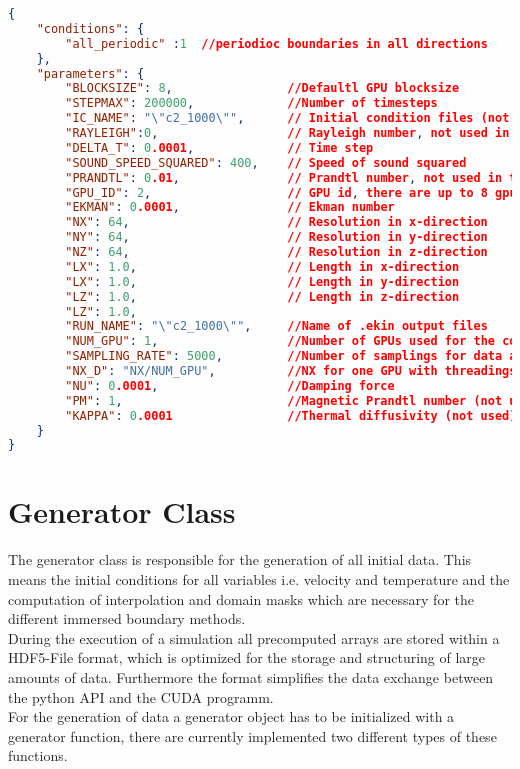 \begin{minipage}{\linewidth}
\begin{lstlisting}[language=json, caption={'Example of a "parameter.json" file.}, label={lst_json} ]
{
    "conditions": {
        "all_periodic" :1  //periodioc boundaries in all directions
    },
    "parameters": {
        "BLOCKSIZE": 8,                //Defaultl GPU blocksize
        "STEPMAX": 200000,             //Number of timesteps
        "IC_NAME": "\"c2_1000\"",      // Initial condition files (not in use anymore)
        "RAYLEIGH":0,                  // Rayleigh number, not used in this thesis
        "DELTA_T": 0.0001,             // Time step
        "SOUND_SPEED_SQUARED": 400,    // Speed of sound squared
        "PRANDTL": 0.01,               // Prandtl number, not used in this thesis
        "GPU_ID": 2,                   // GPU id, there are up to 8 gpus in one system
        "EKMAN": 0.0001,               // Ekman number
        "NX": 64,                      // Resolution in x-direction
        "NY": 64,                      // Resolution in y-direction
        "NZ": 64,                      // Resolution in z-direction
        "LX": 1.0,                     // Length in x-direction
        "LX": 1.0,                     // Length in y-direction
        "LZ": 1.0,                     // Length in z-direction
        "LZ": 1.0,
        "RUN_NAME": "\"c2_1000\"",     //Name of .ekin output files
        "NUM_GPU": 1,                  //Number of GPUs used for the computation
        "SAMPLING_RATE": 5000,         //Number of samplings for data analysis
        "NX_D": "NX/NUM_GPU",          //NX for one GPU with threadings
        "NU": 0.0001,                  //Damping force
        "PM": 1,                       //Magnetic Prandtl number (not used)
        "KAPPA": 0.0001                //Thermal diffusivity (not used)
    }
}
\end{lstlisting}
\end{minipage}

\section{Generator Class}

The generator class is responsible for the generation of all initial data.
This means the initial conditions for all variables i.e. velocity and temperature
and the computation of interpolation and domain masks which are necessary for the different
immersed boundary methods.\\
During the execution of a simulation all precomputed arrays are stored within a
HDF5-File format, which is optimized for the storage and structuring of large amounts of data.
Furthermore the format simplifies the data exchange between the python API and the CUDA programm.\\
For the generation of data a generator object has to be initialized with a generator function,
there are currently implemented two different types of these functions.

